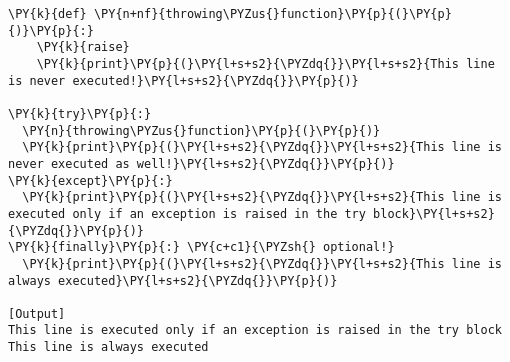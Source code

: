 \begin{Verbatim}[label=\makebox{\url{https://github.com/lucabaldini/cmepda/tree/master/slides/latex/snippets/exceptions.py}},commandchars=\\\{\}]
\PY{k}{def} \PY{n+nf}{throwing\PYZus{}function}\PY{p}{(}\PY{p}{)}\PY{p}{:}
    \PY{k}{raise}
    \PY{k}{print}\PY{p}{(}\PY{l+s+s2}{\PYZdq{}}\PY{l+s+s2}{This line is never executed!}\PY{l+s+s2}{\PYZdq{}}\PY{p}{)}

\PY{k}{try}\PY{p}{:}
  \PY{n}{throwing\PYZus{}function}\PY{p}{(}\PY{p}{)}
  \PY{k}{print}\PY{p}{(}\PY{l+s+s2}{\PYZdq{}}\PY{l+s+s2}{This line is never executed as well!}\PY{l+s+s2}{\PYZdq{}}\PY{p}{)}
\PY{k}{except}\PY{p}{:}
  \PY{k}{print}\PY{p}{(}\PY{l+s+s2}{\PYZdq{}}\PY{l+s+s2}{This line is executed only if an exception is raised in the try block}\PY{l+s+s2}{\PYZdq{}}\PY{p}{)}
\PY{k}{finally}\PY{p}{:} \PY{c+c1}{\PYZsh{} optional!}
  \PY{k}{print}\PY{p}{(}\PY{l+s+s2}{\PYZdq{}}\PY{l+s+s2}{This line is always executed}\PY{l+s+s2}{\PYZdq{}}\PY{p}{)}

[Output]
This line is executed only if an exception is raised in the try block
This line is always executed
\end{Verbatim}